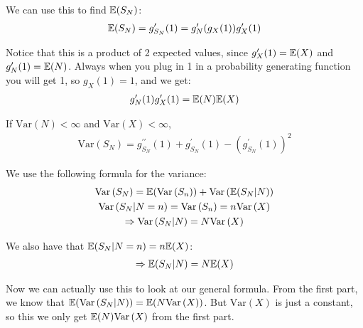 \noindent We can use this to find $\mathbb{E}(S_N)$:
\begin{equation*}
  \begin{gathered}
    \mathbb{E}(S_N) = g_{S_N}^{\prime}(1) = g_N^{\prime}(g_X(1))g_X^{\prime}(1)
  \end{gathered}
\end{equation*}\par
\noindent Notice that this is a product of 2 expected values, since $g_X^{\prime}(1) = \mathbb{E}(X)$ and $g_N^{\prime}(1) = \mathbb{E}(N)$. Always when you plug in 1 in a probability generating function you will get 1, so $g_X(1) = 1$, and we get:
\begin{equation*}
  \begin{gathered}
    g_N^{\prime}(1)g_X^{\prime}(1) = \mathbb{E}(N)\mathbb{E}(X)
  \end{gathered}
\end{equation*}\par
\noindent If $\text{Var}\left(N\right)<\infty$ and $\text{Var}\left(X\right)<\infty$, 
\begin{equation*}
  \begin{gathered}
    \text{Var}\left(S_N\right) = g_{S_N}^{\prime\prime}(1)+g_{S_N}^{\prime}(1)- \left(g_{S_N}^{\prime}(1)\right)^2
  \end{gathered}
\end{equation*}\par
\noindent We use the following formula for the variance:
\begin{equation*}
  \begin{gathered}
    \text{Var}\left(S_N\right) = \mathbb{E}(\text{Var}\left(S_n\right))+\text{Var}\left(\mathbb{E}(S_N|N)\right)\\
    \text{Var}\left(S_N|N=n\right) = \text{Var}\left(S_n\right) = n\text{Var}\left(X\right)\\
    \Rightarrow \text{Var}\left(S_N|N\right) = N\text{Var}\left(X\right)
  \end{gathered}
\end{equation*}\par
\noindent We also have that $\mathbb{E}(S_N|N=n) = n\mathbb{E}(X)$:
\begin{equation*}
  \begin{gathered}
    \Rightarrow\mathbb{E}(S_N|N) = N\mathbb{E}(X)
  \end{gathered}
\end{equation*}\par
\noindent Now we can actually use this to look at our general formula. From the first part, we know that $\mathbb{E}(\text{Var}\left(S_N|N\right)) = \mathbb{E}(N\text{Var}\left(X\right))$. But $\text{Var}\left(X\right)$ is just a constant, so this we only get $\mathbb{E}(N)\text{Var}\left(X\right)$ from the first part.\par
